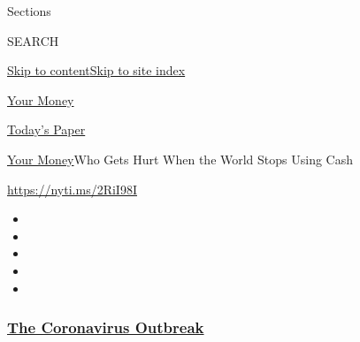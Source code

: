 Sections

SEARCH

\protect\hyperlink{site-content}{Skip to
content}\protect\hyperlink{site-index}{Skip to site index}

\href{https://www.nytimes3xbfgragh.onion/section/your-money}{Your Money}

\href{https://myaccount.nytimes3xbfgragh.onion/auth/login?response_type=cookie\&client_id=vi}{}

\href{https://www.nytimes3xbfgragh.onion/section/todayspaper}{Today's
Paper}

\href{/section/your-money}{Your Money}\textbar{}Who Gets Hurt When the
World Stops Using Cash

\url{https://nyti.ms/2RiI98I}

\begin{itemize}
\item
\item
\item
\item
\item
\end{itemize}

\hypertarget{the-coronavirus-outbreak}{%
\subsubsection{\texorpdfstring{\href{https://www.nytimes3xbfgragh.onion/news-event/coronavirus?name=styln-coronavirus-national\&region=TOP_BANNER\&block=storyline_menu_recirc\&action=click\&pgtype=Article\&impression_id=8c17d640-f52c-11ea-bf06-e35e969503ac\&variant=undefined}{The
Coronavirus
Outbreak}}{The Coronavirus Outbreak}}\label{the-coronavirus-outbreak}}

